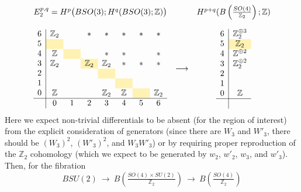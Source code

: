 \documentclass[12pt]{article}
\numberwithin{equation}{section}
\def\bZ{\mathbb{Z}}
\begin{document}
\begin{equation}
	\begin{array}{ccc}
		E_2^{p,q}=H^p\big(BSO(3);H^q(BSO(3);\bZ)\big) && H^{p+q}(B\left(\tfrac{SO(4)}{\bZ_2}\right);\bZ)\vspace{4mm}\\
		\begin{array}{c|ccccccccccccc}
			6 & \bZ_2 && \ast & \ast & \ast & \ast & \ast \\
			5  & \hphantom{\bZ_2}\cellcolor{lightyellow} & \hphantom{\bZ_2} & \hphantom{\bZ_2} & \hphantom{\bZ_2} & \hphantom{\bZ_2} & \hphantom{\bZ_2} \\
			4  & \bZ & \cellcolor{lightyellow} && \ast & \ast && \ast\\
			3  & \bZ_2 && \bZ_2\cellcolor{lightyellow} & \bZ_2 & \ast & \ast & \ast \\
			2  & &  && \cellcolor{lightyellow} &&\\
			1  &  &&  && \cellcolor{lightyellow} &&\\
			0 & \bZ &  && \bZ_2 & \bZ & \cellcolor{lightyellow} & \bZ_2\\
			\hline
			& 0 & 1 & 2 & 3 & 4 & 5 & 6 \\
		\end{array}
		& \longrightarrow & 
		\begin{array}{c|c}
			6  &\bZ_2^{\oplus 3}\\
			5  & \bZ_2\cellcolor{lightyellow}\\
			4  & \bZ^{\oplus 2}\\
			3  & \bZ_2^{\oplus 2}\\
			2  & \\
			1  & \\
			0 & \bZ\\
			\hline\\
		\end{array}
	\end{array}
\end{equation}
Here we expect non-trivial differentials to be absent (for the region of interest)
from the explicit consideration of generators (since there are $W_3$ and $W'_3$, there should be $(W_3)^2$, $(W'_3)^2$, and $W_3W'_3$)
or by requiring proper reproduction of the $\bZ_2$ cohomology (which we expect to be generated by $w_2$, $w'_2$, $w_3$, and $w'_3$).
Then, for the fibration
\begin{equation}
	BSU(2)
	\ \to\ 
	B\left(\tfrac{SO(4)\times SU(2)}{\bZ_2}\right)
	\ \to\ 
	B\left(\tfrac{SO(4)}{\bZ_2}\right)
\end{equation}
\end{document}
